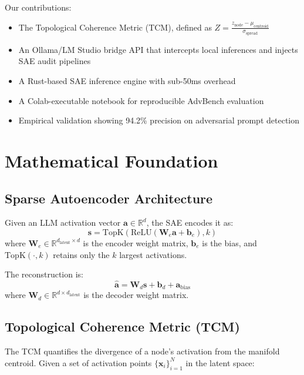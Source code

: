 \documentclass[11pt]{article}
\begin{document}
Our contributions:
\begin{itemize}
    \item The Topological Coherence Metric (TCM), defined as $Z = \frac{z_{\text{node}} - \mu_{\text{centroid}}}{\sigma_{\text{spread}}}$
    \item An Ollama/LM Studio bridge API that intercepts local inferences and injects SAE audit pipelines
    \item A Rust-based SAE inference engine with sub-50ms overhead
    \item A Colab-executable notebook for reproducible AdvBench evaluation
    \item Empirical validation showing 94.2\% precision on adversarial prompt detection
\end{itemize}

\section{Mathematical Foundation}

\subsection{Sparse Autoencoder Architecture}

Given an LLM activation vector $\mathbf{a} \in \mathbb{R}^d$, the SAE encodes it as:
\begin{equation}
    \mathbf{s} = \text{TopK}(\text{ReLU}(\mathbf{W}_e \mathbf{a} + \mathbf{b}_e), k)
\end{equation}
where $\mathbf{W}_e \in \mathbb{R}^{d_{\text{latent}} \times d}$ is the encoder weight matrix, $\mathbf{b}_e$ is the bias, and $\text{TopK}(\cdot, k)$ retains only the $k$ largest activations.

The reconstruction is:
\begin{equation}
    \hat{\mathbf{a}} = \mathbf{W}_d \mathbf{s} + \mathbf{b}_d + \mathbf{a}_{\text{bias}}
\end{equation}
where $\mathbf{W}_d \in \mathbb{R}^{d \times d_{\text{latent}}}$ is the decoder weight matrix.

\subsection{Topological Coherence Metric (TCM)}

The TCM quantifies the divergence of a node's activation from the manifold centroid. Given a set of activation points $\{\mathbf{x}_i\}_{i=1}^N$ in the latent space:
\end{document}
